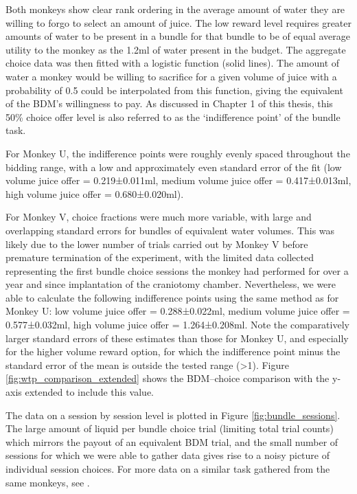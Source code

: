 Both monkeys show clear rank ordering in the average amount of water they are willing to forgo to select an amount of juice. The low reward level requires greater amounts of water to be present in a bundle for that bundle to be of equal average utility to the monkey as the 1.2ml of water present in the budget. The aggregate choice data was then fitted with a logistic function (solid lines). The amount of water a monkey would be willing to sacrifice for a given volume of juice with a probability of 0.5 could be interpolated from this function, giving the equivalent of the BDM's willingness to pay. As discussed in Chapter 1 of this thesis, this 50\% choice offer level is also referred to as the ‘indifference point’ of the bundle task.

For Monkey U, the indifference points were roughly evenly spaced throughout the bidding range, with a low and approximately even standard error of the fit (low volume juice offer = 0.219±0.011ml, medium volume juice offer = 0.417±0.013ml, high volume juice offer = 0.680±0.020ml).

For Monkey V, choice fractions were much more variable, with large and overlapping standard errors for bundles of equivalent water volumes. This was likely due to the lower number of trials carried out by Monkey V before premature termination of the experiment, with the limited data collected representing the first bundle choice sessions the monkey had performed for over a year and since implantation of the craniotomy chamber. Nevertheless, we were able to calculate the following indifference points using the same method as for Monkey U: low volume juice offer = 0.288±0.022ml, medium volume juice offer = 0.577±0.032ml, high volume juice offer = 1.264±0.208ml. Note the comparatively larger standard errors of these estimates than those for Monkey U, and especially for the higher volume reward option, for which the indifference point minus the standard error of the mean is outside the tested range (>1). Figure \ref{fig:wtp_comparison_extended} shows the BDM--choice comparison with the y-axis extended to include this value.

The data on a session by session level is plotted in Figure \ref{fig:bundle_sessions}. The large amount of liquid per bundle choice trial (limiting total trial counts) which mirrors the payout of an equivalent BDM trial, and the small number of sessions for which we were able to gather data gives rise to a noisy picture of individual session choices. For more data on a similar task gathered from the same monkeys, see \cite{almohammadRewardValueRevealed2022}.

